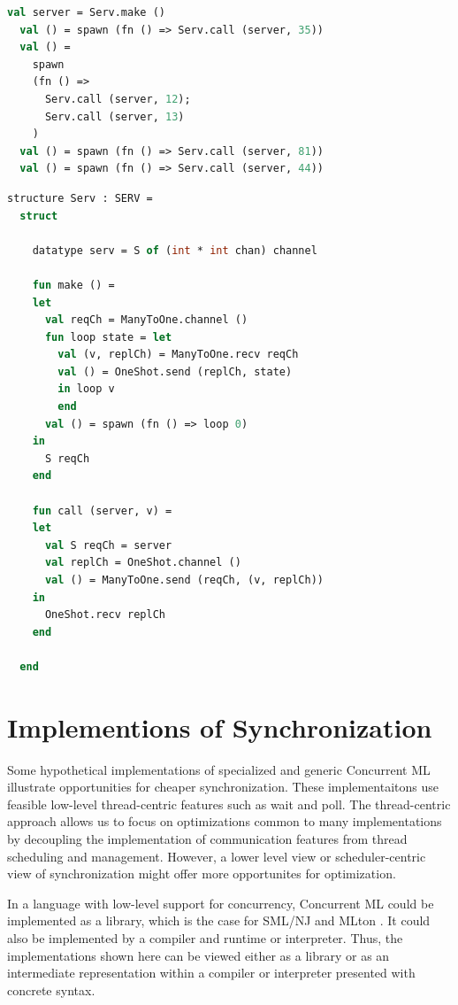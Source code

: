 \documentclass[10pt]{article}
\begin{document}
\begin{lstlisting}[language=ML, mathescape]
  val server = Serv.make ()
  val () = spawn (fn () => Serv.call (server, 35))
  val () =
    spawn
    (fn () => 
      Serv.call (server, 12); 
      Serv.call (server, 13)
    )
  val () = spawn (fn () => Serv.call (server, 81))
  val () = spawn (fn () => Serv.call (server, 44))
\end{lstlisting}

\begin{lstlisting}[language=ML, mathescape]
  structure Serv : SERV =
  struct 

    datatype serv = S of (int * int chan) channel 

    fun make () =
    let 
      val reqCh = ManyToOne.channel ()
      fun loop state = let
        val (v, replCh) = ManyToOne.recv reqCh
        val () = OneShot.send (replCh, state)
        in loop v
        end
      val () = spawn (fn () => loop 0)
    in
      S reqCh
    end 

    fun call (server, v) =
    let 
      val S reqCh = server
      val replCh = OneShot.channel ()
      val () = ManyToOne.send (reqCh, (v, replCh))
    in
      OneShot.recv replCh
    end

  end
\end{lstlisting}

\section{Implementions of Synchronization}
Some hypothetical implementations of specialized and generic
Concurrent ML illustrate opportunities
for cheaper synchronization. These implementaitons use 
feasible low-level thread-centric features such as wait and poll.  The thread-centric approach
allows us to focus on optimizations common to many implementations by decoupling the
implementation of communication features from thread scheduling and management. However, a
lower level view or scheduler-centric view of synchronization might offer more opportunites
for optimization.

In a language with low-level support for concurrency,
Concurrent ML could be implemented as a library,
which is the case for SML/NJ \cite{} and MLton \cite{}.
It could also be implemented by a compiler and runtime or interpreter.
Thus, the implementations shown here can be viewed either as a library or as an intermediate
representation within a compiler or interpreter presented with concrete syntax.
\end{document}
